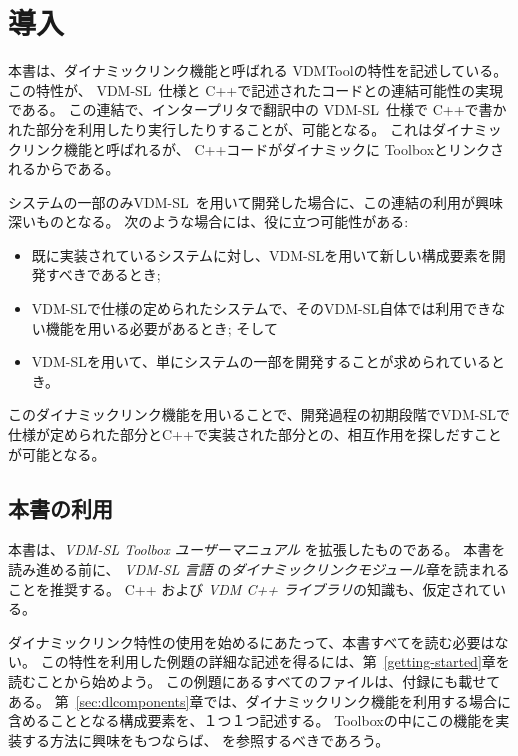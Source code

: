 \documentclass[\pformat,12pt]{jarticle}
\newcommand{\vdmslpp}{VDM-SL}
\begin{document}


\section{導入}

本書は、ダイナミックリンク機能と呼ばれる VDMToolの特性を記述している。
この特性が、 \vdmslpp\ 仕様と C++で記述されたコードとの連結可能性の実現である。
この連結で、インタープリタで翻訳中の \vdmslpp\ 仕様で C++で書かれた部分を利用したり実行したりすることが、可能となる。 
これはダイナミックリンク機能と呼ばれるが、 C++コードがダイナミックに Toolboxとリンクされるからである。

システムの一部のみ\vdmslpp\ を用いて開発した場合に、この連結の利用が興味深いものとなる。
次のような場合には、役に立つ可能性がある:

\begin{itemize}
\item 既に実装されているシステムに対し、VDM-SLを用いて新しい構成要素を開発すべきであるとき;
\item VDM-SLで仕様の定められたシステムで、そのVDM-SL自体では利用できない機能を用いる必要があるとき; そして
\item VDM-SLを用いて、単にシステムの一部を開発することが求められているとき。
\end{itemize}

このダイナミックリンク機能を用いることで、開発過程の初期段階でVDM-SLで仕様が定められた部分とC++で実装された部分との、相互作用を探しだすことが可能となる。


\subsection{本書の利用}

本書は、{\it VDM-SL Toolbox ユーザーマニュアル} \cite{UserMan-SCSK}を拡張したものである。
本書を読み進める前に、  {\it VDM-SL 言語} \cite{LangMan-SCSK}の{\it ダイナミックリンクモジュール}章を読まれることを推奨する。
C++ \cite{Stroustrup91} および {\it VDM C++ ライブラリ}\cite{LibMan-SCSK}の知識も、仮定されている。

ダイナミックリンク特性の使用を始めるにあたって、本書すべてを読む必要はない。
この特性を利用した例題の詳細な記述を得るには、第~\ref{getting-started}章を
読むことから始めよう。
この例題にあるすべてのファイルは、付録にも載せてある。
第~\ref{sec:dlcomponents}章では、ダイナミックリンク機能を利用する場合に含めることとなる構成要素を、１つ１つ記述する。
Toolboxの中にこの機能を実装する方法に興味をもつならば、 \cite{Frohlich&96}を参照するべきであろう。
\end{document}

